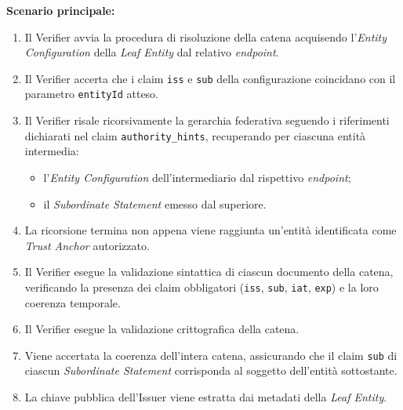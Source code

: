 \noindent\textbf{Scenario principale:}
\begin{enumerate}
    \item Il Verifier avvia la procedura di risoluzione della catena acquisendo l'\textit{Entity Configuration} della \textit{Leaf Entity} dal relativo \textit{endpoint}.
    \item Il Verifier accerta che i claim \texttt{iss} e \texttt{sub} della configurazione coincidano con il parametro \texttt{entityId} atteso.
    \item Il Verifier risale ricorsivamente la gerarchia federativa seguendo i riferimenti dichiarati nel claim \texttt{authority\_\allowbreak{}hints}, recuperando per ciascuna entità intermedia:
    \begin{itemize}
        \item l'\textit{Entity Configuration} dell'intermediario dal rispettivo \textit{endpoint};
        \item il \textit{Subordinate Statement} emesso dal superiore.
    \end{itemize}
    \item La ricorsione termina non appena viene raggiunta un'entità identificata come \textit{Trust Anchor} autorizzato.
    \item Il Verifier esegue la validazione sintattica di ciascun documento della catena, verificando la presenza dei claim obbligatori (\texttt{iss}, \texttt{sub}, \texttt{iat}, \texttt{exp}) e la loro coerenza temporale.
    \item Il Verifier esegue la validazione crittografica della catena.
    \item Viene accertata la coerenza dell'intera catena, assicurando che il claim \texttt{sub} di ciascun \textit{Subordinate Statement} corrisponda al soggetto dell'entità sottostante.
    \item La chiave pubblica dell'Issuer viene estratta dai metadati della \textit{Leaf Entity}.
\end{enumerate}

